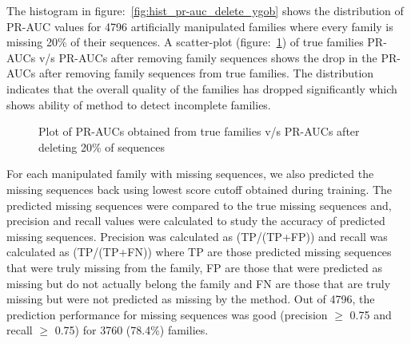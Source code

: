 \documentclass{article}
\begin{document}
		The histogram in figure:~\ref{fig:hist_pr-auc_delete_ygob} shows the distribution of PR-AUC values for 4796 artificially manipulated families where every family is missing 20\% of their sequences. A scatter-plot (figure:~\ref{fig:scatter_pr-auc_true_vs_pr-auc_delete_ygob}) of true families PR-AUCs v/s PR-AUCs after removing family sequences shows the drop in the PR-AUCs after removing family sequences from true families. The distribution indicates that the overall quality of the families has dropped significantly which shows ability of method to detect incomplete families.
		
		\begin{figure}
			\caption{Plot of PR-AUCs obtained from true families v/s PR-AUCs after deleting 20\% of sequences}
			\label{fig:scatter_pr-auc_true_vs_pr-auc_delete_ygob}
		\end{figure}
	
		For each manipulated family with missing sequences, we also predicted the missing sequences back using lowest score cutoff obtained during training. The predicted missing sequences were compared to the true missing sequences and, precision and recall values were calculated to study the accuracy of predicted missing sequences. Precision was calculated as (TP/(TP+FP)) and recall was calculated as (TP/(TP+FN)) where TP are those predicted missing sequences that were truly missing from the family, FP are those that were predicted as missing but do not actually belong the family and FN are those that are truly missing but were not predicted as missing by the method. Out of 4796, the prediction performance for missing sequences was good (precision $\geq$ 0.75 and recall $\geq$ 0.75) for 3760 (78.4\%) families.
		
\end{document}
